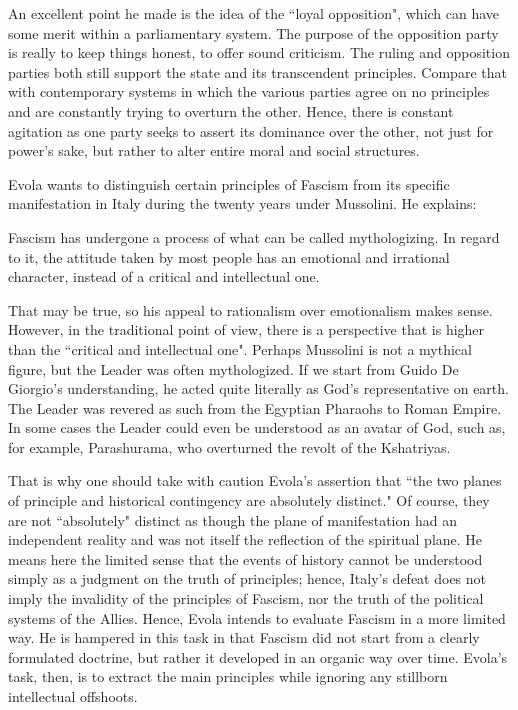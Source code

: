 An excellent point he made is the idea of the ``loyal opposition", which can have some merit within a parliamentary system. The purpose of the opposition party is really to keep things honest, to offer sound criticism. The ruling and opposition parties both still support the state and its transcendent principles. Compare that with contemporary systems in which the various parties agree on no principles and are constantly trying to overturn the other. Hence, there is constant agitation as one party seeks to assert its dominance over the other, not just for power's sake, but rather to alter entire moral and social structures.

Evola wants to distinguish certain principles of Fascism from its specific manifestation in Italy during the twenty years under Mussolini. He explains:

\begin{quotex}
Fascism has undergone a process of what can be called mythologizing. In regard to it, the attitude taken by most people has an emotional and irrational character, instead of a critical and intellectual one. 

\end{quotex}
That may be true, so his appeal to rationalism over emotionalism makes sense. However, in the traditional point of view, there is a perspective that is higher than the ``critical and intellectual one". Perhaps Mussolini is not a mythical figure, but the Leader was often mythologized. If we start from Guido De Giorgio's understanding, he acted quite literally as God's representative on earth. The Leader was revered as such from the Egyptian Pharaohs to Roman Empire. In some cases the Leader could even be understood as an avatar of God, such as, for example, Parashurama, who overturned the revolt of the Kshatriyas.

That is why one should take with caution Evola's assertion that ``the two planes of principle and historical contingency are absolutely distinct." Of course, they are not ``absolutely" distinct as though the plane of manifestation had an independent reality and was not itself the reflection of the spiritual plane. He means here the limited sense that the events of history cannot be understood simply as a judgment on the truth of principles; hence, Italy's defeat does not imply the invalidity of the principles of Fascism, nor the truth of the political systems of the Allies. Hence, Evola intends to evaluate Fascism in a more limited way. He is hampered in this task in that Fascism did not start from a clearly formulated doctrine, but rather it developed in an organic way over time. Evola's task, then, is to extract the main principles while ignoring any stillborn intellectual offshoots.

